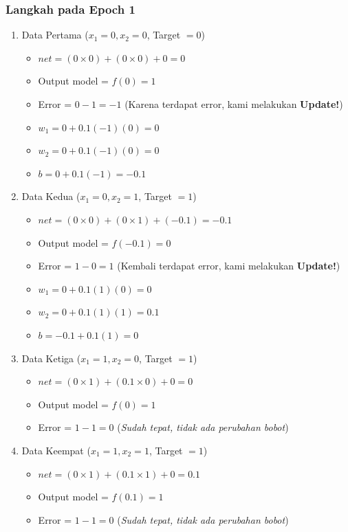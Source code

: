 \documentclass[12pt,a4paper]{article}
\begin{document}
\subsubsection*{Langkah pada Epoch 1}
\begin{enumerate}
    \item Data Pertama ($x_1=0, x_2=0$, Target $=0$)
    \begin{itemize}
        \item $net = (0 \times 0) + (0 \times 0) + 0 = 0$
        \item Output model = $f(0) = 1$
        \item Error = $0 - 1 = -1$ (Karena terdapat error, kami melakukan \textbf{Update!})
        \item $w_1 = 0 + 0.1(-1)(0) = 0$
        \item $w_2 = 0 + 0.1(-1)(0) = 0$
        \item $b = 0 + 0.1(-1) = -0.1$
    \end{itemize}
    \item Data Kedua ($x_1=0, x_2=1$, Target $=1$)
    \begin{itemize}
        \item $net = (0 \times 0) + (0 \times 1) + (-0.1) = -0.1$
        \item Output model = $f(-0.1) = 0$
        \item Error = $1 - 0 = 1$ (Kembali terdapat error, kami melakukan \textbf{Update!})
        \item $w_1 = 0 + 0.1(1)(0) = 0$
        \item $w_2 = 0 + 0.1(1)(1) = 0.1$
        \item $b = -0.1 + 0.1(1) = 0$
    \end{itemize}
    \item Data Ketiga ($x_1=1, x_2=0$, Target $=1$)
    \begin{itemize}
        \item $net = (0 \times 1) + (0.1 \times 0) + 0 = 0$
        \item Output model = $f(0) = 1$
        \item Error = $1 - 1 = 0$ (\textit{Sudah tepat, tidak ada perubahan bobot})
    \end{itemize}
    \item Data Keempat ($x_1=1, x_2=1$, Target $=1$)
    \begin{itemize}
        \item $net = (0 \times 1) + (0.1 \times 1) + 0 = 0.1$
        \item Output model = $f(0.1) = 1$
        \item Error = $1 - 1 = 0$ (\textit{Sudah tepat, tidak ada perubahan bobot})
    \end{itemize}
\end{enumerate}
\end{document}
